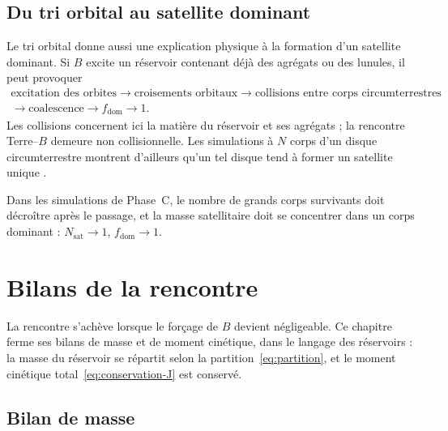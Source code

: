 \documentclass[11pt,a4paper,openany]{report}
\begin{document}
\section{Du tri orbital au satellite dominant}

Le tri orbital donne aussi une explication physique à la formation d'un satellite dominant. Si $B$
excite un réservoir contenant déjà des agrégats ou des lunules, il peut provoquer
\begin{equation}
\begin{gathered}
\text{excitation des orbites}\rightarrow\text{croisements orbitaux}\rightarrow
\text{collisions entre corps circumterrestres}\\
\rightarrow\text{coalescence}\rightarrow f_{\mathrm{dom}}\rightarrow1.
\end{gathered}
\label{eq:chaine-dominance}
\end{equation}
Les collisions concernent ici la matière du réservoir et ses agrégats ; la rencontre Terre--$B$
demeure non collisionnelle. Les simulations à $N$ corps d'un disque circumterrestre montrent
d'ailleurs qu'un tel disque tend à former un satellite unique \cite{Kokubo2000}.

\begin{consequence}
Dans les simulations de Phase~C, le nombre de grands corps survivants doit décroître après le
passage, et la masse satellitaire doit se concentrer dans un corps dominant : $N_{\mathrm{sat}}\to1$,
$f_{\mathrm{dom}}\to1$.
\end{consequence}

\chapter{Bilans de la rencontre}
\label{ch:bilans}

La rencontre s'achève lorsque le forçage de $B$ devient négligeable. Ce chapitre ferme ses bilans
de masse et de moment cinétique, dans le langage des réservoirs : la masse du réservoir se
répartit selon la partition~\eqref{eq:partition}, et le moment cinétique total~\eqref{eq:conservation-J}
est conservé.

\section{Bilan de masse}
\end{document}
